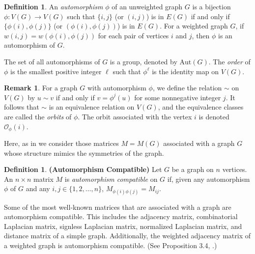 \documentclass[preprint,12pt]{elsarticle}
\newcommand{\Aut}{\text{Aut}}
\renewcommand{\so}{\mathscr{O}}
\theoremstyle{definition}
\newtheorem{remark}[thm]{Remark}
\newtheorem{defn}[thm]{Definition}
\theoremstyle{remark}
\renewcommand{\emph}{\textit}
\begin{document}
\begin{defn}
An \emph{automorphism} $\phi$ of an unweighted graph $G$ is a bijection $\phi: V(G) \to V(G)$ such that $\{i,j\}$ (or $(i,j)$) is in $E(G)$ if and only if $\{\phi(i), \phi(j)\}$ (or $(\phi(i), \phi(j))$) is in $E(G)$. For a weighted graph $G$, if $w(i,j) = w(\phi(i), \phi(j))$ for each pair of vertices $i$ and $j$, then $\phi$ is an automorphism of $G$.

The set of all automorphisms of $G$ is a group, denoted by $\Aut(G)$. The \emph{order} of $\phi$ is the smallest positive integer $\ell$ such that $\phi^\ell$ is the identity map on $V(G)$.
\end{defn}

\begin{remark}\label{rem:orbits}
For a graph $G$ with automorphism $\phi$, we define the relation $\sim$ on $V(G)$ by $u \sim v$ if and only if $v = \phi^j(u)$ for some nonnegative integer $j$. It follows that $\sim$ is an equivalence relation on $V(G)$, and the equivalence classes are called the \emph{orbits} of $\phi$. The orbit associated with the vertex $i$ is denoted $\so_\phi(i)$. 
\end{remark}

Here, as in \cite{BFW} we consider those matrices $M=M(G)$ associated with a graph $G$ whose structure mimics the symmetries of the graph.

\begin{defn}\label{def:autocomp}\textbf{(Automorphism Compatible)}
Let $G$ be a graph on $n$ vertices. An $n \times n$ matrix $M$ is \emph{automorphism compatible} on $G$ if, given any automorphism $\phi$ of $G$ and any $i, j \in \{1, 2, \ldots, n\}$,
$M_{\phi(i) \phi(j)} = M_{i j}$.
\end{defn}

Some of the most well-known matrices that are associated with a graph are automorphism compatible. This includes the adjacency matrix, combinatorial Laplacian matrix, signless Laplacian matrix, normalized Laplacian matrix, and distance matrix of a simple graph. Additionally, the weighted adjacency matrix of a weighted graph is automorphism compatible. (See Proposition 3.4, \cite{BFW}.)

\end{document}
